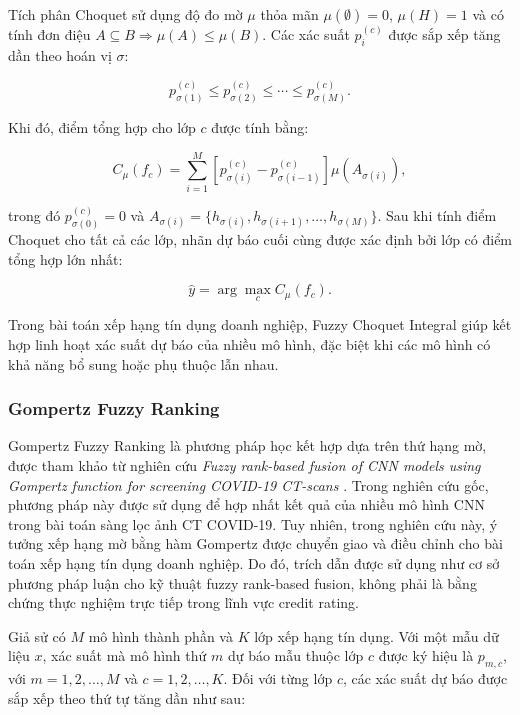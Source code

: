\documentclass[10pt,twoside]{article}
\begin{document}
Tích phân Choquet sử dụng độ đo mờ $\mu$ thỏa mãn $\mu(\emptyset)=0$, $\mu(H)=1$ và có tính đơn điệu $A \subseteq B \Rightarrow \mu(A) \leq \mu(B)$. Các xác suất $p_i^{(c)}$ được sắp xếp tăng dần theo hoán vị $\sigma$:

\begin{equation}
    p_{\sigma(1)}^{(c)} \leq p_{\sigma(2)}^{(c)} \leq \cdots \leq p_{\sigma(M)}^{(c)}.
\end{equation}

Khi đó, điểm tổng hợp cho lớp $c$ được tính bằng:

\begin{equation}
    C_{\mu}(f_c) =
    \sum_{i=1}^{M}
    \left[p_{\sigma(i)}^{(c)} - p_{\sigma(i-1)}^{(c)}\right]
    \mu(A_{\sigma(i)}),
\end{equation}

trong đó $p_{\sigma(0)}^{(c)}=0$ và $A_{\sigma(i)}=\{h_{\sigma(i)},h_{\sigma(i+1)},\ldots,h_{\sigma(M)}\}$. Sau khi tính điểm Choquet cho tất cả các lớp, nhãn dự báo cuối cùng được xác định bởi lớp có điểm tổng hợp lớn nhất:

\begin{equation}
    \hat{y} = \arg\max_c C_{\mu}(f_c).
\end{equation}

Trong bài toán xếp hạng tín dụng doanh nghiệp, Fuzzy Choquet Integral giúp kết hợp linh hoạt xác suất dự báo của nhiều mô hình, đặc biệt khi các mô hình có khả năng bổ sung hoặc phụ thuộc lẫn nhau.

\subsubsection{Gompertz Fuzzy Ranking}

Gompertz Fuzzy Ranking là phương pháp học kết hợp dựa trên thứ hạng mờ, được tham khảo từ nghiên cứu \textit{Fuzzy rank-based fusion of CNN models using Gompertz function for screening COVID-19 CT-scans} \cite{kundu_fuzzy_2021}. Trong nghiên cứu gốc, phương pháp này được sử dụng để hợp nhất kết quả của nhiều mô hình CNN trong bài toán sàng lọc ảnh CT COVID-19. Tuy nhiên, trong nghiên cứu này, ý tưởng xếp hạng mờ bằng hàm Gompertz được chuyển giao và điều chỉnh cho bài toán xếp hạng tín dụng doanh nghiệp. Do đó, trích dẫn \cite{kundu_fuzzy_2021} được sử dụng như cơ sở phương pháp luận cho kỹ thuật fuzzy rank-based fusion, không phải là bằng chứng thực nghiệm trực tiếp trong lĩnh vực credit rating.

Giả sử có $M$ mô hình thành phần và $K$ lớp xếp hạng tín dụng. Với một mẫu dữ liệu $x$, xác suất mà mô hình thứ $m$ dự báo mẫu thuộc lớp $c$ được ký hiệu là $p_{m,c}$, với $m=1,2,\ldots,M$ và $c=1,2,\ldots,K$. Đối với từng lớp $c$, các xác suất dự báo được sắp xếp theo thứ tự tăng dần như sau:
\end{document}

